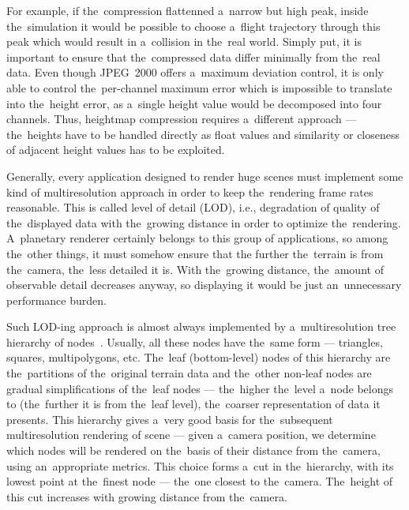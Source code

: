 For example, if the~compression flattenned a~narrow but high peak, inside the~simulation it would be possible to choose a~flight trajectory through this peak which would result in a~collision in the~real world. Simply put, it is important to ensure that the~compressed data differ minimally from the~real data. Even though JPEG~2000 offers a~maximum deviation control, it is only able to control the~per-channel maximum error which is impossible to translate into the~height error, as a~single height value would be decomposed into four channels. Thus, heightmap compression requires a~different approach --- the~heights have to be handled directly as float values and similarity or closeness of adjacent height values has to be exploited.

Generally, every application designed to render huge scenes must implement some kind of multiresolution approach in order to keep the~rendering frame rates reasonable. This is called level of detail (LOD), i.e., degradation of quality of the~displayed data with the~growing distance in order to optimize the~rendering. A~planetary renderer certainly belongs to this group of applications, so among the~other things, it must somehow ensure that the further the~terrain is from the~camera, the~less detailed it is. With the~growing distance, the~amount of observable detail decreases anyway, so displaying it would be just an~unnecessary performance burden. 

Such LOD-ing approach is almost always implemented by a~multiresolution tree hierarchy of nodes~\cite{survey}. Usually, all these nodes have the~same form --- triangles, squares, multipolygons, etc. The~leaf (bottom-level) nodes of this hierarchy are the~partitions of the~original terrain data and the~other non-leaf nodes are gradual simplifications of the~leaf nodes --- the~higher the~level a~node belongs to (the~further it is from the~leaf level), the~coarser representation of data it presents. This hierarchy gives a~very good basis for the~subsequent multiresolution rendering of scene --- given a~camera position, we determine which nodes will be rendered on the~basis of their distance from the~camera, using an~appropriate metrics. This choice forms a~cut in the~hierarchy, with its lowest point at the~finest node --- the~one closest to the~camera. The~height of this cut increases with growing distance from the~camera. 

